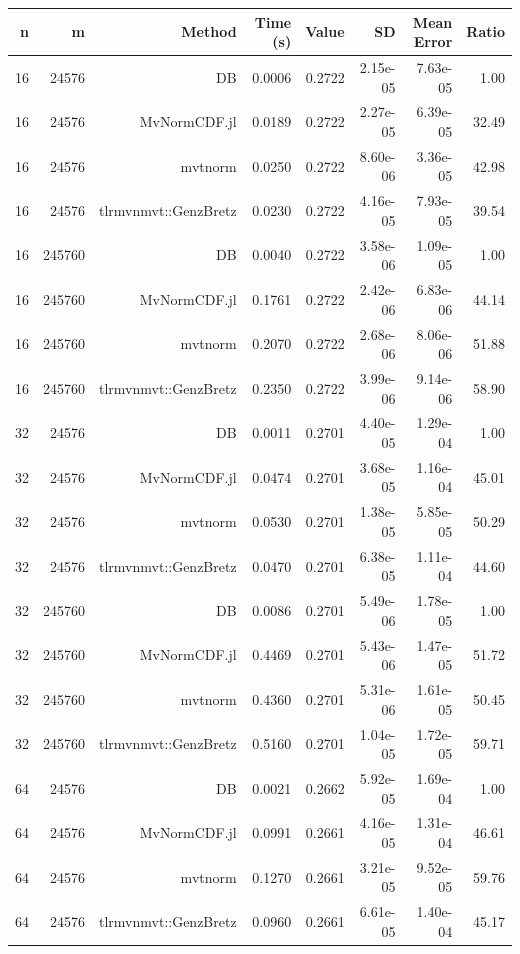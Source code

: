 \begin{tabular}{|r|r|r|r|r|r|r|r|}
  \hline
  \textbf{n} & \textbf{m} & \textbf{Method} & \textbf{Time (s)} & \textbf{Value} & \textbf{SD} & \textbf{Mean Error} & \textbf{Ratio} \\
  \hline
  16 & 24576 & DB & 0.0006 & 0.2722 & 2.15e-05 & 7.63e-05 & 1.00 \\
  16 & 24576 & MvNormCDF.jl & 0.0189 & 0.2722 & 2.27e-05 & 6.39e-05 & 32.49 \\
  16 & 24576 & mvtnorm & 0.0250 & 0.2722 & 8.60e-06 & 3.36e-05 & 42.98 \\
  16 & 24576 & tlrmvnmvt::GenzBretz & 0.0230 & 0.2722 & 4.16e-05 & 7.93e-05 & 39.54 \\
  16 & 245760 & DB & 0.0040 & 0.2722 & 3.58e-06 & 1.09e-05 & 1.00 \\
  16 & 245760 & MvNormCDF.jl & 0.1761 & 0.2722 & 2.42e-06 & 6.83e-06 & 44.14 \\
  16 & 245760 & mvtnorm & 0.2070 & 0.2722 & 2.68e-06 & 8.06e-06 & 51.88 \\
  16 & 245760 & tlrmvnmvt::GenzBretz & 0.2350 & 0.2722 & 3.99e-06 & 9.14e-06 & 58.90 \\
  32 & 24576 & DB & 0.0011 & 0.2701 & 4.40e-05 & 1.29e-04 & 1.00 \\
  32 & 24576 & MvNormCDF.jl & 0.0474 & 0.2701 & 3.68e-05 & 1.16e-04 & 45.01 \\
  32 & 24576 & mvtnorm & 0.0530 & 0.2701 & 1.38e-05 & 5.85e-05 & 50.29 \\
  32 & 24576 & tlrmvnmvt::GenzBretz & 0.0470 & 0.2701 & 6.38e-05 & 1.11e-04 & 44.60 \\
  32 & 245760 & DB & 0.0086 & 0.2701 & 5.49e-06 & 1.78e-05 & 1.00 \\
  32 & 245760 & MvNormCDF.jl & 0.4469 & 0.2701 & 5.43e-06 & 1.47e-05 & 51.72 \\
  32 & 245760 & mvtnorm & 0.4360 & 0.2701 & 5.31e-06 & 1.61e-05 & 50.45 \\
  32 & 245760 & tlrmvnmvt::GenzBretz & 0.5160 & 0.2701 & 1.04e-05 & 1.72e-05 & 59.71 \\
  64 & 24576 & DB & 0.0021 & 0.2662 & 5.92e-05 & 1.69e-04 & 1.00 \\
  64 & 24576 & MvNormCDF.jl & 0.0991 & 0.2661 & 4.16e-05 & 1.31e-04 & 46.61 \\
  64 & 24576 & mvtnorm & 0.1270 & 0.2661 & 3.21e-05 & 9.52e-05 & 59.76 \\
  64 & 24576 & tlrmvnmvt::GenzBretz & 0.0960 & 0.2661 & 6.61e-05 & 1.40e-04 & 45.17 \\

\end{tabular}
